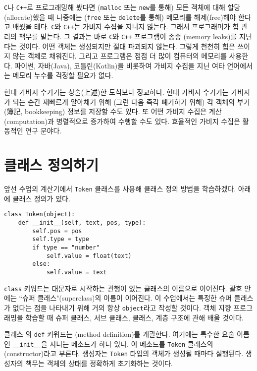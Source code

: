 \documentclass[a4paper]{oblivoir}
\begin{document}
\texttt{C}나 \texttt{C++}로 프로그래밍해 봤다면 (\texttt{malloc} 또는 \texttt{new}를 통해) 모든 객체에 대해 할당(allocate)했을 때 나중에는 (\texttt{free} 또는 \texttt{delete}를 통해) 메모리를 해제(free)해야 한다고 배웠을 테다. \texttt{C}와 \texttt{C++}는 가비지 수집을 지니지 않는다. 그래서 프로그래머가 힙 관리의 책무를 맡는다. 그 결과는 바로 \texttt{C}와 \texttt{C++} 프로그램이 종종 (memory leaks)를 지닌다는 것이다. 어떤 객체는 생성되지만 절대 파괴되지 않는다. 그렇게 천천히 힙은 쓰이지 않는 객체로 채워진다. 그리고 프로그램은 점점 더 많이 컴퓨터의 메모리를 사용한다. 파이썬, 자바(Java), 코틀린(Kotlin)을 비롯하여 가비지 수집을 지닌 여타 언어에서는 메모리 누수를 걱정할 필요가 없다.

현대 가비지 수거기는 상술(上述)한 도식보다 정교하다. 현대 가비지 수거기는 가비지가 되는 순간 재빠르게 알아채기 위해 (그런 다음 즉각 폐기하기 위해) 각 객체의 부기(簿記, bookkeeping) 정보를 저장할 수도 있다. 또 어떤 가비지 수집은 계산(computation)과 병렬적으로 증가하여 수행할 수도 있다. 효율적인 가비지 수집은 활동적인 연구 분야다.

\section*{클래스 정의하기}

앞선 수업의 계산기에서 \texttt{Token} 클래스를 사용해 클래스 정의 방법을 학습하겠다. 아래에 클래스 정의가 있다.

\begin{verbatim}
class Token(object):
    def __init__(self, text, pos, type):
        self.pos = pos
        self.type = type
        if type == "number"
            self.value = float(text)
        else:
            self.value = text
\end{verbatim}

\noindent\texttt{class} 키워드는 대문자로 시작하는 관행이 있는 클래스의 이름으로 이어진다. 괄호 안에는 ``슈퍼 클래스"(superclass)의 이름이 이어진다. 이 수업에서는 특정한 슈퍼 클래스가 없다는 점을 나타내기 위해 거의 항상 \texttt{object}라고 작성할 것이다. 객체 지향 프로그래밍을 학습할 때 슈퍼 클래스, 서브 클래스, 클래스, 계층 구조에 관해 배울 것이다.

클래스 의 \texttt{def} 키워드는 (method definition)를 개괄한다. 여기에는 특수한 요술 이름인 \texttt{\_\_init\_\_}을 지니는 메소드가 하나 있다. 이 메소드를 \texttt{Token} 클래스의 (constructor)라고 부른다. 생성자는 \texttt{Token} 타입의 객체가 생성될 때마다 실행된다. 생성자의 책무는 객체의 상태를 정확하게 초기화하는 것이다.
\end{document}
